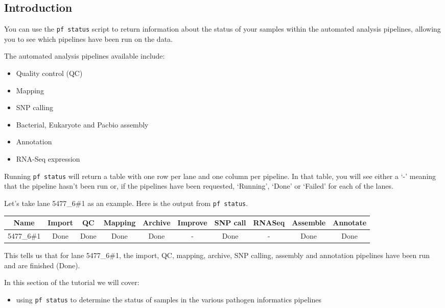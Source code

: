 \documentclass[11pt]{article}
\providecommand{\tightlist}{%
      \setlength{\itemsep}{0pt}\setlength{\parskip}{0pt}}
\begin{document}
    \hypertarget{introduction}{%
\subsection{Introduction}\label{introduction}}

You can use the \texttt{pf\ status} script to return information about
the status of your samples within the automated analysis pipelines,
allowing you to see which pipelines have been run on the data.

The automated analysis pipelines available include:

\begin{itemize}
\tightlist
\item
  Quality control (QC)
\item
  Mapping
\item
  SNP calling
\item
  Bacterial, Eukaryote and Pacbio assembly
\item
  Annotation
\item
  RNA-Seq expression
\end{itemize}

Running \texttt{pf\ status} will return a table with one row per lane
and one column per pipeline. In that table, you will see either a `-'
meaning that the pipeline hasn't been run or, if the pipelines have been
requested, `Running', `Done' or `Failed' for each of the lanes.

Let's take lane 5477\_6\#1 as an example. Here is the output from
\texttt{pf\ status}.

\begin{longtable}[]{@{}cccccccccc@{}}
\hline
Name & Import & QC & Mapping & Archive & Improve & SNP call & RNASeq &
Assemble & Annotate\tabularnewline
\hline
\endhead
5477\_6\#1 & Done & Done & Done & Done & - & Done & - & Done &
Done\tabularnewline
\hline
\end{longtable}

This tells us that for lane 5477\_6\#1, the import, QC, mapping,
archive, SNP calling, assembly and annotation pipelines have been run
and are finished (Done).

In this section of the tutorial we will cover:

\begin{itemize}
\tightlist
\item
  using \texttt{pf\ status} to determine the status of samples in the
  various pathogen informatics pipelines
\end{itemize}
\end{document}
